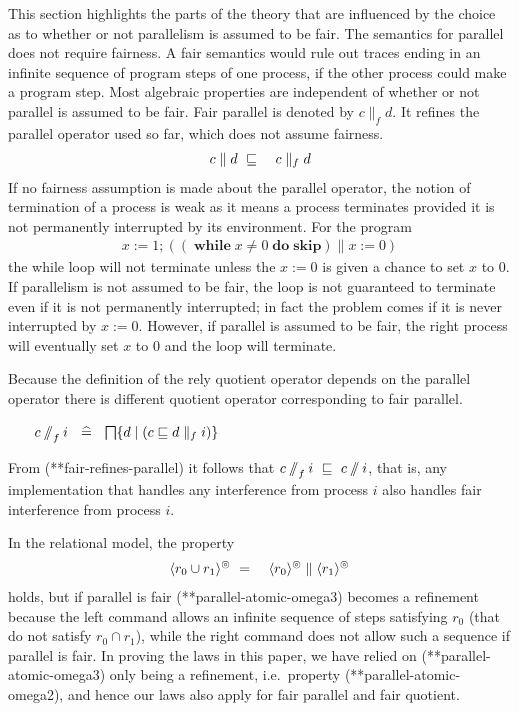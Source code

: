 \documentclass[fleqn]{fac}
\makeatletter
\newcommand{\labelproperty}[1]{\label{property-#1}\index{Property!#1|PropertyDef{\ref{property-#1}}}}
\def\refproperty{\@ifnextchar*{\@refproperty}{\@@refproperty}}
\def\@refproperty*#1{\ref{property-#1}\index{Property!#1|LawUse}}
\def\@@refproperty#1{property~(\ref{property-#1})\index{Property!#1|LawUse}}
\newcommand{\atomicrel}[1]{\langle#1\rangle}
\newcommand{\omegaskip}{\circledcirc}
\newcommand{\InfSkipIter}{^{\omegaskip}}
\newcommand{\InfGuar}[1]{\atomicrel{#1}\InfSkipIter}
\newcommand{\sdefs}{\mathrel{\widehat=}}\newcommand{\spot}{\mathrel{{\cdot}}}\newcommand{\where}{\mathrel{|}}\renewcommand{\implies}{\mathrel{\Rightarrow}}\newcommand{\emptyrel}{\emptyset}
\newenvironment{refine}{\begin{displaymath}\begin{array}{l}}{\end{array}\end{displaymath}}
\newcommand{\Nondet}{\mathop{\textstyle\bigsqcap}}
\newcommand{\quotient}{\mathbin{/\!\!/}}
\newcommand{\Keyword}[1]{\mathsf{\mathbf{#1}}}
\newcommand{\While}{\mathop{\Keyword{while}}}
\newcommand{\Do}{\mathop{\Keyword{do}}}
\newcommand{\Skip}{\Keyword{skip}}
\makeatother
\begin{document}
This section highlights the parts of the theory that are influenced by
the choice as to whether or not parallelism is assumed to be fair.
The semantics for parallel does not require fairness.
A fair semantics would rule out traces ending in an infinite sequence of
program steps of one process, if the other process could make a program step.
Most algebraic properties are independent of whether or not parallel 
is assumed to be fair.
Fair parallel is denoted by $c \parallel_f d$.
It refines the parallel operator used so far, which does not assume fairness.
\begin{eqnarray}
  c \parallel d & ~\refsto~ & c \parallel_f d
    \labelproperty{fair-refines-parallel}
\end{eqnarray}
If no fairness assumption is made about the parallel operator,
the notion of termination of a process is weak as it means 
a process terminates provided it is not permanently interrupted by its environment.
For the program
\begin{refine}
  x := 1;
  ((\While x \neq 0 \Do \Skip) \parallel x := 0)
\end{refine}the while loop will not terminate unless the $x := 0$
is given a chance to set $x$ to 0.
If parallelism is not assumed to be fair, 
the loop is not guaranteed to terminate even if it is not permanently interrupted;
in fact the problem comes if it is never interrupted by $x := 0$.
However, if parallel is assumed to be fair,
the right process will eventually set $x$ to 0 and the loop will terminate.

Because the definition of the rely quotient operator depends on the parallel operator
there is different quotient operator corresponding to fair parallel.
\begin{definitionx}~~~
\(
  c \quotient_f i ~~\sdefs~~ \Nondet \{ d \where (c \refsto d \parallel_f i) \}
\)
\end{definitionx}
From (\refproperty*{fair-refines-parallel}) it follows that 
$c \quotient_f i ~\refsto~ c \quotient i$,
that is, any implementation that handles any interference from process $i$
also handles fair interference from process $i$.

In the relational model, the property
\begin{eqnarray}
  \InfGuar{r_0 \cup r_1} & ~=~ & \InfGuar{r_0} \parallel \InfGuar{r_1}
    \labelproperty{parallel-atomic-omega3}
\end{eqnarray}
holds, but if parallel is fair (\refproperty*{parallel-atomic-omega3}) becomes a refinement 
because the left command allows an infinite sequence of steps satisfying $r_0$
(that do not satisfy $r_0 \cap r_1$),
while the right command does not allow such a sequence if parallel is fair.
In proving the laws in this paper, we have relied on (\refproperty*{parallel-atomic-omega3}) only being a refinement, 
i.e.\ property (\refproperty*{parallel-atomic-omega2}),
and hence our laws also apply for fair parallel and fair quotient.
\end{document}
